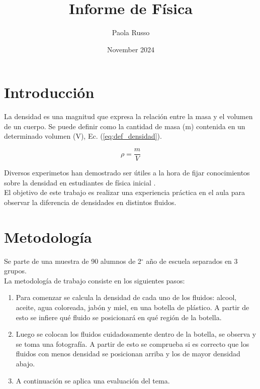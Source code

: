\documentclass{article}
\title{Informe de Física}
\author{Paola Russo}
\date{November 2024}
\begin{document}
\maketitle


\section{Introducción}

La densidad es una magnitud que expresa la relación entre la masa y el volumen de un cuerpo. Se puede definir como la cantidad de masa (m) contenida en un determinado volumen (V), Ec. (\ref{eq:def_densidad}).

\begin{equation}
    \rho = \frac{m}{V}
    \label{eq:def_densidad}
\end{equation}

Diversos experimetos han demostrado ser útiles a la hora de fijar conocimientos sobre la densidad en estudiantes de física inicial \cite{Torres_2018}.\\

El objetivo de este trabajo es realizar una experiencia práctica en el aula para observar la diferencia de densidades en distintos fluidos.

\section{Metodología}

Se parte de una muestra de 90 alumnos de 2$^{\circ}$ año de escuela separados en 3 grupos.\\

La metodología de trabajo consiste en los siguientes pasos:
\begin{enumerate}
    \item Para comenzar se calcula la densidad de cada uno de los fluidos: alcool, aceite, agua coloreada, jabón y miel, en una botella de plástico. A partir de esto se infiere qué fluido se posicionará en qué región de la botella.
    \item Luego se colocan los fluidos cuidadosamente dentro de la botella, se observa y se toma una fotografía. A partir de esto se comprueba si es correcto que los fluidos con menos densidad se posicionan arriba y los de mayor densidad abajo.
    \item A continuación se aplica una evaluación del tema.
\end{enumerate}
\end{document}
